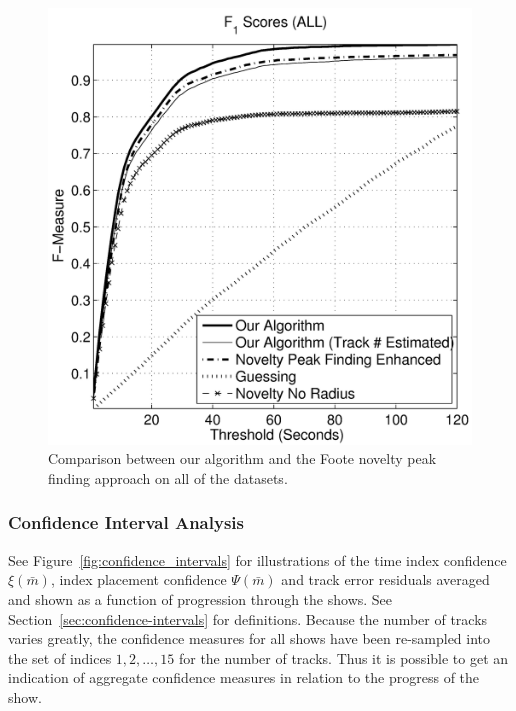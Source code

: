 \documentclass[twocolumn]{article}
\begin{document}
\begin{figure}
	
		\begin{center}
			\includegraphics[scale=0.5]{images/fall}
		\end{center}

	\caption{Comparison between our algorithm and the Foote novelty peak finding approach on all of the datasets.}
	\label{fig:fscores_best}
	
\end{figure}

\subsubsection{Confidence Interval Analysis}

See Figure~\ref{fig:confidence_intervals} for illustrations of the time index confidence $\xi(\bar m)$, index placement confidence $\Psi(\bar m)$ and track error residuals averaged and shown as a function of progression through the shows. See Section~\ref{sec:confidence-intervals} for definitions. Because the number of tracks varies greatly, the confidence measures for all shows have been re-sampled into the set of indices $1,2,\ldots,15$ for the number of tracks. Thus it is possible to get an indication of aggregate confidence measures in relation to the progress of the show. 
\end{document}
